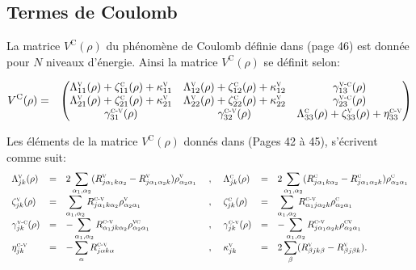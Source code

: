\documentclass[12pt,a4paper,openany,oneside]{book}
\begin{document}
\subsection{Termes de Coulomb}
La matrice $V^{\textrm{C}}(\rho)$ du phénomène de Coulomb définie dans \cite{mareference1}(page 46) est donnée  pour $N$ niveaux d'énergie. Ainsi la matrice $V^{\textrm{C}}(\rho)$ se définit selon:
 \renewcommand{\arraystretch}{1.5}
  {\setlength{\jot}{2cm}
  \begin{eqnarray*}
   V^{\textrm{C}}(\rho)  
 & = & \begin{pmatrix}
\Lambda^{\textsc{v}}_{11}(\rho)+\zeta^{\textsc{c}}_{11}(\rho)+\kappa^{\textsc{v}}_{11} & \Lambda^{\textsc{v}}_{12}(\rho)+\zeta^{\textsc{c}}_{12}(\rho)+\kappa^{\textsc{v}}_{12}   & \gamma^{\textsc{v-c}}_{13}(\rho)\\
\Lambda^{\textsc{v}}_{21}(\rho)+\zeta^{\textsc{c}}_{21}(\rho)+\kappa^{\textsc{v}}_{21}  & \Lambda^{\textsc{v}}_{22}(\rho)+\zeta^{\textsc{c}}_{22}(\rho)+\kappa^{\textsc{v}}_{22}  & \gamma^{\textsc{v-c}}_{23}(\rho)\\
\gamma^{\textsc{c-v}}_{31}(\rho) & \gamma^{\textsc{c-v}}_{32}(\rho) & \Lambda^{\textsc{c}}_{33}(\rho)+\zeta^{\textsc{v}}_{33}(\rho)+\eta^{\textsc{c-v}}_{33}
    \end{pmatrix}         
  \end{eqnarray*}
    {\setlength{\jot}{1cm}
  \renewcommand{\arraystretch}{1}
  
 Les éléments de la matrice $V^{\textrm{C}}(\rho)$ donnés dans \cite{mareference1}(Pages 42 à 45), s'écrivent comme suit: 
 $$
 \begin{array}{lclclcl}
  \Lambda^{\textsc{v}}_{jk}(\rho) &=& 2\displaystyle\sum_{\alpha_{1},\alpha_{2}}(R^{\textsc{v}}_{j\alpha_{1}k\alpha_{2}}-R^{\textsc{v}}_{j\alpha_{1}\alpha_{2}k})\rho^{\textsc{v}}_{\alpha_{2}\alpha_{1}} & \; , \; &
 \Lambda^{\textsc{c}}_{jk}(\rho) &=& 2\displaystyle\sum_{\alpha_{1},\alpha_{2}}(R^{\textsc{c}}_{j\alpha_{1}k\alpha_{2}}-R^{\textsc{c}}_{j\alpha_{1}\alpha_{2}k})\rho^{\textsc{c}}_{\alpha_{2}\alpha_{1}}\\ 
\zeta^{\textsc{v}}_{jk}(\rho) &=& \displaystyle\sum_{\alpha_{1},\alpha_{2}}R^{\textsc{c-v}}_{j\alpha_{1}k\alpha_{2}}\rho^{\textsc{v}}_{\alpha_{2}\alpha_{1}} & \; , \; &
\zeta^{\textsc{c}}_{jk}(\rho) &=& \displaystyle\sum_{\alpha_{1},\alpha_{2}}R^{\textsc{c-v}}_{\alpha_{1}j\alpha_{2}k}\rho^{\textsc{c}}_{\alpha_{2}\alpha_{1}}\\
 \gamma^{\textsc{v-c}}_{jk}(\rho) &=& -\displaystyle\sum_{\alpha_{1},\alpha_{2}}R^{\textsc{c-v}}_{\alpha_{1}jk\alpha_{2}}\rho^{\textsc{vc}}_{\alpha_{2}\alpha_{1}} & \; , \; &
\gamma^{\textsc{c-v}}_{jk}(\rho) &=& -\displaystyle\sum_{\alpha_{1},\alpha_{2}}R^{\textsc{c-v}}_{j\alpha_{1}\alpha_{2}k}\rho^{\textsc{cv}}_{\alpha_{2}\alpha_{1}}\\
\eta^{\textsc{c-v}}_{jk} &=& -\displaystyle\sum_{\alpha}R^{\textsc{c-v}}_{j\alpha k \alpha} & \; , \; &
  \kappa^{\textsc{v}}_{jk} &=& 2\displaystyle\sum_{\beta}(R^{\textsc{v}}_{\beta jk \beta}-R^{\textsc{v}}_{\beta j \beta k}).
 \end{array}
$$

}}
\end{document}

